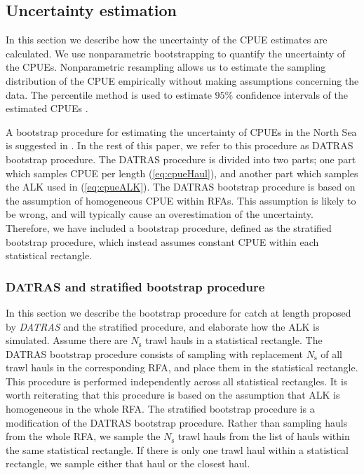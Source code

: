 \documentclass[a4paper 12pt]{article}
\numberwithin{equation}{section}
\begin{document}
\subsection{Uncertainty estimation}
\label{sec:uncertaintyestimation}
In this section we describe how the uncertainty of the CPUE estimates are calculated. We use nonparametric bootstrapping to quantify the uncertainty of the CPUEs. Nonparametric resampling allows us to estimate the sampling distribution of the CPUE empirically without making assumptions concerning the data. The percentile method is used to estimate $95\%$ confidence intervals of the estimated CPUEs \citep{carpenter2000bootstrap}. %

A bootstrap procedure for estimating the uncertainty of CPUEs in the North Sea is suggested in  \citet{ICES2013}. In the rest of this paper, we refer to this procedure as DATRAS bootstrap procedure. The DATRAS procedure is divided into two parts; one part which samples CPUE per length (\ref{eq:cpueHaul}), and another part which samples the ALK used in (\ref{eq:cpueALK}). The DATRAS bootstrap procedure is based on the assumption of homogeneous CPUE within RFAs. This assumption is likely to be wrong, and will typically cause an overestimation of the uncertainty. Therefore, we have included a bootstrap procedure, defined as the stratified bootstrap procedure, which instead assumes constant CPUE within each statistical rectangle. 

\subsubsection{DATRAS and stratified bootstrap procedure}
\indent In this section we describe the bootstrap procedure for catch at length proposed by \emph{DATRAS} \citep{ICES2013} and the stratified procedure, and elaborate how the ALK is simulated. Assume there are $N_{\text{s}}$ trawl hauls in a statistical rectangle. The DATRAS bootstrap procedure consists of sampling with replacement $N_{\text{s}}$ of all trawl hauls in the corresponding RFA, and place them in the statistical rectangle. This procedure is performed independently across all statistical rectangles. It is worth reiterating that this procedure is based on the assumption that ALK is homogeneous in the whole RFA. The stratified bootstrap procedure is a modification of the DATRAS bootstrap procedure. Rather than sampling hauls from the whole RFA, we  sample the $N_{\text{s}}$ trawl hauls from the list of hauls within the same statistical rectangle. If there is only one trawl haul within a statistical rectangle, we sample either that haul or the closest haul.
\end{document}
